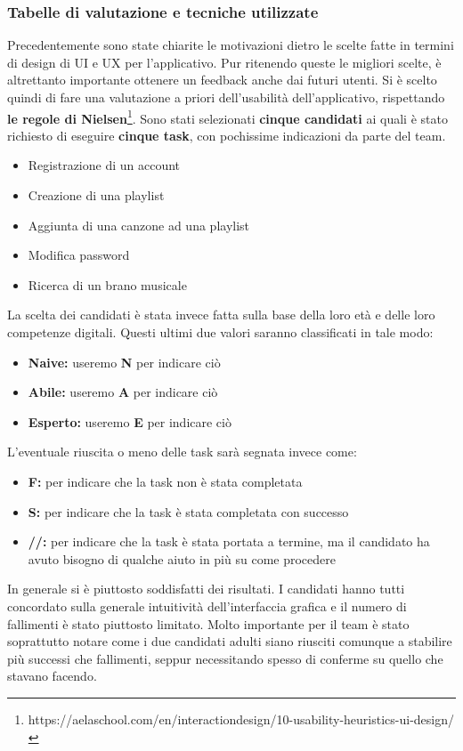 \documentclass{article}
\begin{document}
			\subsubsection{Tabelle di valutazione e tecniche utilizzate}
			Precedentemente sono state chiarite le motivazioni dietro le scelte fatte in termini di design di UI e UX per l’applicativo. Pur ritenendo queste le migliori scelte, è altrettanto importante ottenere un feedback anche dai futuri utenti.
			Si è scelto quindi di fare una valutazione a priori dell’usabilità dell’applicativo, rispettando \textbf{le regole di Nielsen}\footnote{https://aelaschool.com/en/interactiondesign/10-usability-heuristics-ui-design/}.
			Sono stati selezionati \textbf{cinque candidati} ai quali è stato richiesto di eseguire \textbf{cinque task}, con pochissime indicazioni da parte del team.
			\begin{itemize}
				\item Registrazione di un account
				\item Creazione di una playlist
				\item Aggiunta di una canzone ad una playlist
				\item Modifica password
				\item Ricerca di un brano musicale
			\end{itemize}
			La scelta dei candidati è stata invece fatta sulla base della loro età e delle loro competenze digitali.
			Questi ultimi due valori saranno classificati in tale modo:
			\begin{itemize}
				\item \textbf{Naive:} useremo \textbf{N} per indicare ciò
				\item \textbf{Abile:} useremo \textbf{A} per indicare ciò
				\item \textbf{Esperto:} useremo \textbf{E} per indicare ciò
			\end{itemize}
			L’eventuale riuscita o meno delle task sarà segnata invece come:
			\begin{itemize}
				\item \textbf{F:} per indicare che la task non è stata completata
				\item \textbf{S:} per indicare che la task è stata completata con successo
				\item \textbf{//:} per indicare che la task è stata portata a termine, ma il candidato ha avuto bisogno di qualche aiuto in più su come procedere
			\end{itemize}
			
			In generale si è piuttosto soddisfatti dei risultati. I candidati hanno tutti concordato sulla generale intuitività dell’interfaccia grafica e il numero di fallimenti è stato piuttosto limitato. 
			Molto importante per il team è stato soprattutto notare come i due candidati adulti siano riusciti comunque a stabilire più successi che fallimenti, seppur necessitando spesso di conferme su quello che stavano facendo.
			\newpage
\end{document}
